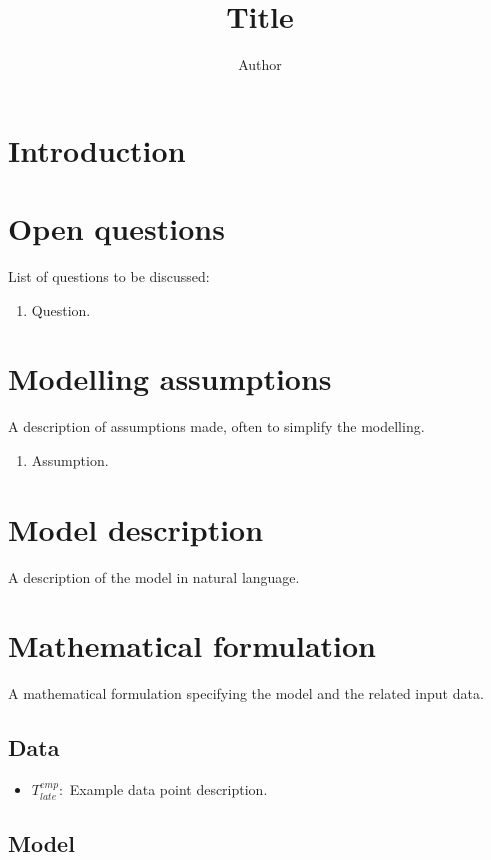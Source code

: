 \documentclass[12pt, a4paper, leqno]{article}
\title{Title}
\author{Author}
\begin{document}
\maketitle

\section{Introduction}

\section{Open questions}

List of questions to be discussed:

\begin{enumerate}
    \item Question.
\end{enumerate}

\section{Modelling assumptions}

A description of assumptions made, often to simplify the modelling.

\begin{enumerate}
    \item Assumption.
\end{enumerate}

\section{Model description}

A description of the model in natural language.

\section{Mathematical formulation}

A mathematical formulation specifying the model and the related input data.

\subsection{Data}

\begin{itemize}
    \item
        \begin{math}
            T^{emp}_{late}:
        \end{math}
        Example data point description.
\end{itemize}

\subsection{Model}

\todos
\end{document}

